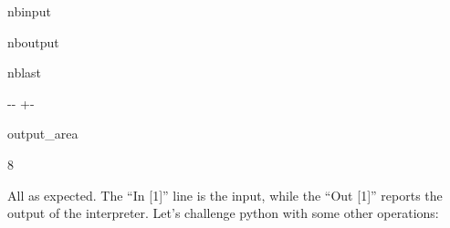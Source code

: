 \documentclass[letterpaper,10pt,english]{sphinxmanual}
\begin{document}
\begin{sphinxuseclass}{nbinput}
{
\begin{sphinxVerbatim}[commandchars=\\\{\}]
\llap{\color{nbsphinxin}[2]:\,\hspace{\fboxrule}\hspace{\fboxsep}}  
\end{sphinxVerbatim}
}

\end{sphinxuseclass}
\begin{sphinxuseclass}{nboutput}
\begin{sphinxuseclass}{nblast}
{

\kern-\sphinxverbatimsmallskipamount\kern-\baselineskip
\kern+\FrameHeightAdjust\kern-\fboxrule
\vspace{\nbsphinxcodecellspacing}

\begin{sphinxuseclass}{output_area}
\begin{sphinxuseclass}{}


\begin{sphinxVerbatim}[commandchars=\\\{\}]
\llap{\color{nbsphinxout}[2]:\,\hspace{\fboxrule}\hspace{\fboxsep}}8
\end{sphinxVerbatim}



\end{sphinxuseclass}
\end{sphinxuseclass}
}

\end{sphinxuseclass}
\end{sphinxuseclass}
\sphinxAtStartPar
All as expected. The “In {[}1{]}” line is the input, while the “Out {[}1{]}” reports the output of the interpreter. Let’s challenge python with some other operations:
\end{document}
